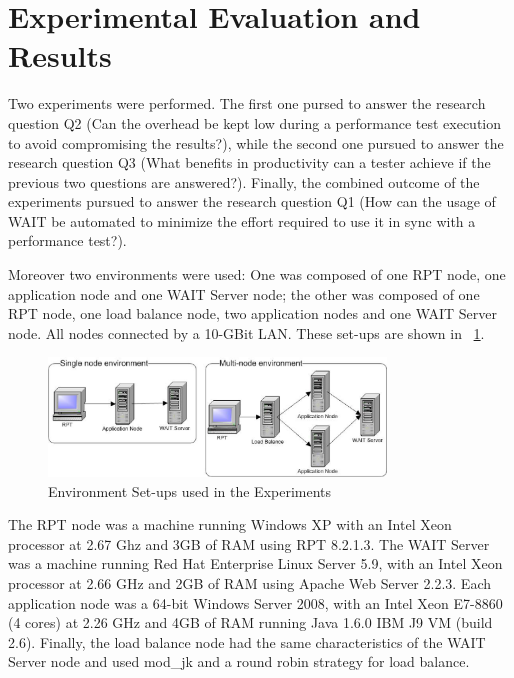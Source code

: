 \documentclass[runningheads,a4paper]{llncs}
\begin{document}
\section{Experimental Evaluation and Results}
\vspace{-5pt}

Two experiments were performed. The first one pursed to answer the
research question Q2 (Can the overhead be kept low during a performance test
execution to avoid compromising the results?), while the second one pursued to
answer the research question Q3 (What benefits in productivity can a tester achieve if the previous
two questions are answered?). Finally, the combined outcome of the experiments
pursued to answer the research question Q1 (How can the usage of WAIT be
automated to minimize the effort required to use it in sync with a performance test?).

Moreover two environments were used: One was composed of one RPT node,
one application node and one WAIT Server node; the other was composed of one RPT
node, one load balance node, two application nodes and one WAIT Server node. All
nodes connected by a 10-GBit LAN. These set-ups are shown in \figurename
~\ref{fig_env}.
\vspace{-5pt}
\begin{figure}[!h]
\centering
\includegraphics[totalheight=.20\textheight,width=0.8\textwidth]{Environments}
\caption{Environment Set-ups used in the Experiments}
\label{fig_env}
\end{figure}
\vspace{-5pt}
The RPT node was a machine running Windows XP with an Intel Xeon processor at
2.67 Ghz and 3GB of RAM using RPT 8.2.1.3. The WAIT Server was a machine running
Red Hat Enterprise Linux Server 5.9, with an Intel Xeon processor at 2.66 GHz
and 2GB of RAM using Apache Web Server 2.2.3. Each application node was a 64-bit
Windows Server 2008, with an Intel Xeon E7-8860 (4 cores) at 2.26 GHz and 4GB of
RAM running Java 1.6.0 IBM J9 VM (build 2.6). Finally, the load balance node had
the same characteristics of the WAIT Server node and used mod\_jk and a round
robin strategy for load balance.
\vspace{-5pt}
\end{document}
